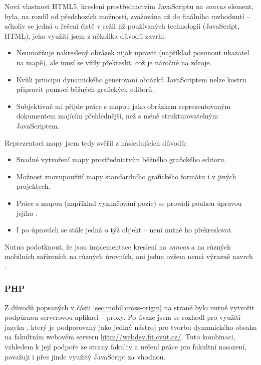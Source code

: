 Nová vlastnost HTML5, kreslení prostřednictvím JavaScriptu na \textit{canvas} element, byla, na rozdíl od předchozích možností, zvažována až do finálního rozhodnutí -- ačkoliv se jedná o řešení čistě v režii již používaných technologií (JavaScript, HTML), jeho využití jsem z několika důvodů zavrhl:
\begin{itemize}
 \item Neumožňuje nakreslený obrázek nijak upravit (například posunout ukazatel na mapě), ale musí se vždy překreslit, což je náročné na zdroje.
 \item Kvůli principu dynamického generovaní obrázků JavaScriptem nelze kostru připravit pomocí běžných grafických editorů.
 \item Subjektivně mi přijde práce s mapou jako  obrázkem reprezentovaným  dokumentem majícím  přehlednější, než s méně strukturovatelným JavaScriptem.
\end{itemize}

Reprezentaci mapy jsem tedy svěřil  z následujících důvodů:
\begin{itemize}
 \item Snadné vytvoření mapy prostřednictvím běžného grafického editoru.
 \item Možnost znovupoužití mapy standardního grafického formátu i v jiných projektech.
 \item Práce s mapou (například vyznačování pozic) se provádí pouhou úpravou jejího .
 \item I po úpravách se stále jedná o týž objekt -- není nutné ho překreslovat.
\end{itemize}

Nutno podotknout, že jsou implementace kreslení na \textit{canvas} a  na různých mobilních zařízeních na různých úrovních, ani jedna ovšem nemá výrazně navrch \cite{CanIUse} \cite{MobileHtml}.

\subsubsection{PHP}
Z důvodů popsaných v části \ref{sec:mobil:cross-origin} na straně \pageref{sec:mobil:cross-origin} bylo nutné vytvořit podpůrnou serverovou aplikaci -- proxy. Po úvaze jsem se rozhodl pro využití jazyka , který je podporovaný jako jediný nástroj pro tvorbu dynamického obsahu na fakultním webovém serveru \url{http://webdev.fit.cvut.cz/}. Tuto kombinaci, vzhledem k její podpoře ze strany fakulty a určení práce pro fakultní nasazení, považuji i přes jinde využitý JavaScript za vhodnou.


